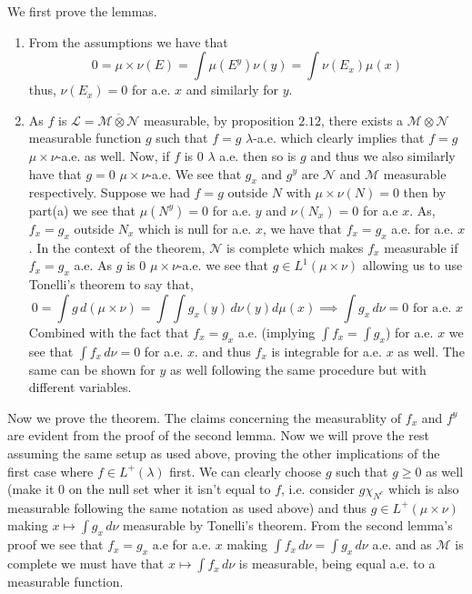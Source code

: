 \documentclass[12pt,a4paper]{article}
\begin{document}
\begin{solution}
    We first prove the lemmas. 
	\begin{enumerate}[label=\alph*.]
		\item From the assumptions we have that
			\[
			    0=\mu\times\nu(E)=\int\mu(E^y)\nu(y)=\int\nu(E_x)\mu(x)
			\]
			thus, $\nu(E_x)=0$ for a.e. $x$ and similarly for $y$.
		\item As $f$ is $\mathcal L=\overline{\mathcal M\otimes\mathcal N}$ measurable, by proposition $2.12$, there exists a $\mathcal M\otimes\mathcal N$ measurable function $g$ such that $f=g$ $\lambda$-a.e. which clearly implies that $f=g$ $\mu\times\nu$-a.e. as well. 
			Now, if $f$ is $0$ $\lambda$ a.e. then so is $g$ and thus we also similarly have that $g=0$ $\mu\times\nu$-a.e. 
			We see that $g_x$ and $g^y$ are $\mathcal N$ and $\mathcal M$ measurable respectively. 
			Suppose we had $f=g$ outside $N$ with $\mu\times\nu(N)=0$ then by part(a) we see that $\mu(N^y)=0$ for a.e. $y$ and $\nu(N_x)=0$ for a.e $x$. 
			As, $f_x=g_x$ outside $N_x$ which is null for a.e. $x$, we have that $f_x=g_x$ a.e. for a.e. $x$. 
			In the context of the theorem, $\mathcal N$ is complete which makes $f_x$ measurable if $f_x=g_x$ a.e. 
			As $g$ is $0$ $\mu\times\nu$-a.e. we see that $g\in L^1(\mu\times\nu)$ allowing us to use Tonelli's theorem to say that,
			\[
				0=\int g\, d(\mu\times\nu)=\int\int g_x(y)\, d\nu(y) d\mu(x)\implies\int g_x\, d\nu=0\text{ for a.e. }x
			\]
			Combined with the fact that $f_x=g_x$ a.e. (implying $\int f_x=\int g_x$) for a.e. $x$ we see that $\int f_x\, d\nu=0$ for a.e. $x$. and thus $f_x$ is integrable for a.e. $x$ as well.
			The same can be shown for $y$ as well following the same procedure but with different variables.
	\end{enumerate}
	Now we prove the theorem.
	The claims concerning the measurablity of $f_x$ and $f^y$ are evident from the proof of the second lemma. 
	Now we will prove the rest assuming the same setup as used above, proving the other implications of the first case where $f\in L^+(\lambda)$ first.
	We can clearly choose $g$ such that $g\geq 0$ as well (make it $0$ on the null set wher it isn't equal to $f$, i.e. consider $g\chi_{N^c}$ which is also measurable  following the same notation as used above) and thus $g\in L^+(\mu\times\nu)$ making $x\mapsto\int g_x\,d\nu$ measurable by Tonelli's theorem. 
	From the second lemma's proof we see that $f_x=g_x$ a.e for a.e. $x$ making $\int f_x\,d\nu=\int g_x\,d\nu$ a.e. and as $\mathcal M$ is complete we must have that $x\mapsto\int f_x\,d\nu$ is measurable, being equal a.e. to a measurable function. 

\end{solution}
\end{document}
